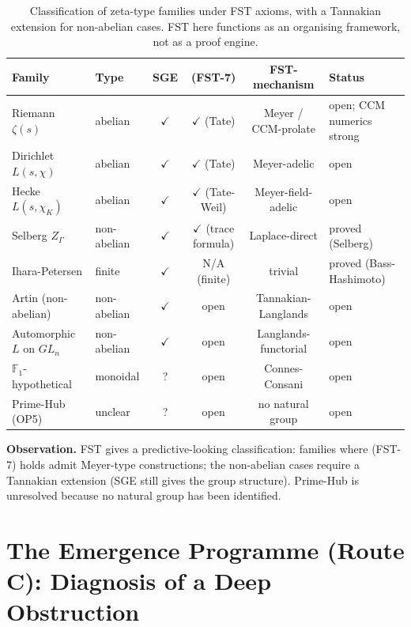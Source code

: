 \documentclass[11pt,a4paper]{article}
\theoremstyle{plain}
\theoremstyle{definition}
\newcommand{\F}{\mathbb{F}}
\newcommand{\chifn}{\chi}
\begin{document}
\begin{table}[h]
\centering
\small
\begin{tabular}{@{}llcccl@{}}
\toprule
\textbf{Family} & \textbf{Type} & \textbf{SGE} & \textbf{(FST-7)} & \textbf{FST-mechanism} & \textbf{Status} \\
\midrule
Riemann $\zeta(s)$ & abelian & $\checkmark$ & $\checkmark$ (Tate) & Meyer / CCM-prolate & open; CCM numerics strong \\
Dirichlet $L(s, \chifn)$ & abelian & $\checkmark$ & $\checkmark$ (Tate) & Meyer-adelic & open \\
Hecke $L(s, \chifn_K)$ & abelian & $\checkmark$ & $\checkmark$ (Tate-Weil) & Meyer-field-adelic & open \\
Selberg $Z_\Gamma$ & non-abelian & $\checkmark$ & $\checkmark$ (trace formula) & Laplace-direct & proved (Selberg) \\
Ihara-Petersen & finite & $\checkmark$ & N/A (finite) & trivial & proved (Bass-Hashimoto) \\
Artin (non-abelian) & non-abelian & $\checkmark$ & open & Tannakian-Langlands & open \\
Automorphic $L$ on $GL_n$ & non-abelian & $\checkmark$ & open & Langlands-functorial & open \\
$\F_1$-hypothetical & monoidal & ? & open & Connes-Consani & open \\
Prime-Hub (OP5) & unclear & ? & open & no natural group & open \\
\bottomrule
\end{tabular}
\caption{Classification of zeta-type families under FST axioms,
with a Tannakian extension for non-abelian cases.  FST here functions
as an organising framework, not as a proof engine.}
\label{tab:classification-v2}
\end{table}

\textbf{Observation.}  FST gives a predictive-looking classification:
families where (FST-7) holds admit Meyer-type constructions; the
non-abelian cases require a Tannakian extension (SGE still gives
the group structure).  Prime-Hub is unresolved because no natural
group has been identified.

\section{The Emergence Programme (Route C): Diagnosis of a Deep Obstruction}
\label{sec:emergence}
\end{document}
